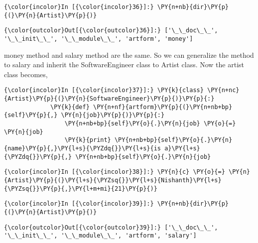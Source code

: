     \begin{Verbatim}[commandchars=\\\{\}]
{\color{incolor}In [{\color{incolor}36}]:} \PY{n+nb}{dir}\PY{p}{(}\PY{n}{Artist}\PY{p}{)}
\end{Verbatim}

            \begin{Verbatim}[commandchars=\\\{\}]
{\color{outcolor}Out[{\color{outcolor}36}]:} ['\_\_doc\_\_', '\_\_init\_\_', '\_\_module\_\_', 'artform', 'money']
\end{Verbatim}
        
    money method and salary method are the same. So we can generalize the
method to salary and inherit the SoftwareEngineer class to Artist class.
Now the artist class becomes,

    \begin{Verbatim}[commandchars=\\\{\}]
{\color{incolor}In [{\color{incolor}37}]:} \PY{k}{class} \PY{n+nc}{Artist}\PY{p}{(}\PY{n}{SoftwareEngineer}\PY{p}{)}\PY{p}{:}
             \PY{k}{def} \PY{n+nf}{artform}\PY{p}{(}\PY{n+nb+bp}{self}\PY{p}{,} \PY{n}{job}\PY{p}{)}\PY{p}{:}
                 \PY{n+nb+bp}{self}\PY{o}{.}\PY{n}{job} \PY{o}{=} \PY{n}{job}
                 \PY{k}{print} \PY{n+nb+bp}{self}\PY{o}{.}\PY{n}{name}\PY{p}{,}\PY{l+s}{\PYZdq{}}\PY{l+s}{is a}\PY{l+s}{\PYZdq{}}\PY{p}{,} \PY{n+nb+bp}{self}\PY{o}{.}\PY{n}{job}
\end{Verbatim}

    \begin{Verbatim}[commandchars=\\\{\}]
{\color{incolor}In [{\color{incolor}38}]:} \PY{n}{c} \PY{o}{=} \PY{n}{Artist}\PY{p}{(}\PY{l+s}{\PYZsq{}}\PY{l+s}{Nishanth}\PY{l+s}{\PYZsq{}}\PY{p}{,}\PY{l+m+mi}{21}\PY{p}{)}
\end{Verbatim}

    \begin{Verbatim}[commandchars=\\\{\}]
{\color{incolor}In [{\color{incolor}39}]:} \PY{n+nb}{dir}\PY{p}{(}\PY{n}{Artist}\PY{p}{)}
\end{Verbatim}

            \begin{Verbatim}[commandchars=\\\{\}]
{\color{outcolor}Out[{\color{outcolor}39}]:} ['\_\_doc\_\_', '\_\_init\_\_', '\_\_module\_\_', 'artform', 'salary']
\end{Verbatim}
        
